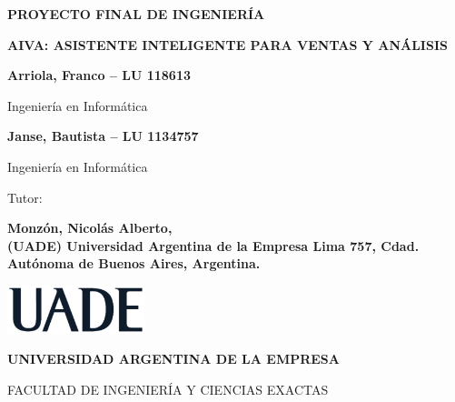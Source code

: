 \begin{titlepage}
    \centering

    {\textbf{\fontsize{18}{20}\selectfont PROYECTO FINAL DE INGENIERÍA} \par}
    \vspace{1.5cm}

    {\textbf{\fontsize{16}{18}\selectfont AIVA: ASISTENTE INTELIGENTE PARA VENTAS Y ANÁLISIS} \par}
    \vspace{0.5cm}

    {\textbf{\fontsize{14}{16}\selectfont Arriola, Franco -- LU 118613} \par}
    {\fontsize{14}{16}\selectfont Ingeniería en Informática \par}
    \vspace{1cm}

    {\textbf{\fontsize{14}{16}\selectfont Janse, Bautista -- LU 1134757} \par}
    {\fontsize{14}{16}\selectfont Ingeniería en Informática \par}
    \vspace{1.5cm}

    {\fontsize{14}{16}\selectfont Tutor: \par}
    {\textbf{\fontsize{14}{16}\selectfont Monzón, Nicolás Alberto,
		\\ (UADE) Universidad Argentina de la Empresa Lima 757, Cdad. Autónoma de Buenos Aires, Argentina.
			} \par}
    \vspace{3cm}

	{\textbf{\fontsize{14}{16}\selectfont \the\year} \par}
    \vspace{2cm}

    \includegraphics[width=0.30\textwidth]{./images/UADE}\par \vspace{1cm}
    {\textbf{\fontsize{14}{16}\selectfont UNIVERSIDAD ARGENTINA DE LA EMPRESA} \par}
    {\fontsize{14}{16}\selectfont FACULTAD DE INGENIERÍA Y CIENCIAS EXACTAS \par}
\end{titlepage}